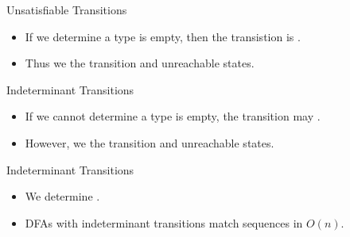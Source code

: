 \begin{frame}{Unsatisfiable Transitions}

  \scalebox{0.8}{}
  \begin{itemize}
  \item   If we determine a type is empty, then the transistion is .
  \item Thus we  the transition and unreachable states.

  \end{itemize}
\end{frame}

\begin{frame}{Indeterminant Transitions}

  \scalebox{0.8}{}

  \begin{itemize}
  \item   If we cannot determine a type is empty, the transition may
    . 
  \item  However, we     the transition and unreachable states.
  \end{itemize}
\end{frame}


\begin{frame}{Indeterminant Transitions}

  \scalebox{0.8}{}

  \begin{itemize}
    \item We  determine .
    \item DFAs with indeterminant transitions 
      match sequences in $O(n)$.
  \end{itemize}
\end{frame}


